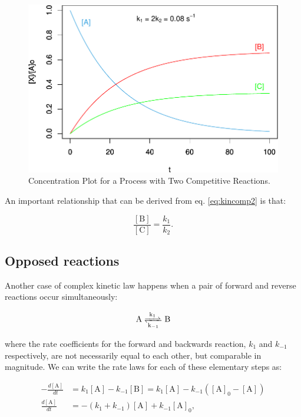 \documentclass[
  9pt,
]{extbook}
\theoremstyle{definition}
\theoremstyle{definition}
\theoremstyle{definition}
\theoremstyle{remark}
\begin{document}
\begin{figure}

{\centering \includegraphics{pchem1_files/figure-latex/figk7-1} 

}

\caption{Concentration Plot for a Process with Two Competitive Reactions.}\label{fig:figk7}
\end{figure}

An important relationship that can be derived from eq. \eqref{eq:kincomp2} is that:

\begin{equation}
\frac{[\mathrm{B}]}{[\mathrm{C}]} =\frac{k_1}{k_2}.
\label{eq:kincomp5b}
\end{equation}

\hypertarget{opposed-reactions}{%
\subsection{Opposed reactions}\label{opposed-reactions}}

Another case of complex kinetic law happens when a pair of forward and reverse reactions occur simultaneously:

\begin{equation}
\mathrm{A}\ce{<=>[k_1][k_{-1}]}\mathrm{B}
\end{equation}

where the rate coefficients for the forward and backwards reaction, \(k_1\) and \(k_{-1}\) respectively, are not necessarily equal to each other, but comparable in magnitude. We can write the rate laws for each of these elementary steps as:

\begin{equation}
\begin{aligned}
-\frac{d[\mathrm{A}]}{dt} &=k_1 [\mathrm{A}]-k_{-1} [\mathrm{B}] = k_1 [\mathrm{A}]-k_{-1}\left([\mathrm{A}]_0-[\mathrm{A}]\right) \\
\frac{d[\mathrm{A}]}{dt} &=-(k_1+k_{-1})[\mathrm{A}] + k_{-1}[\mathrm{A}]_0,
\end{aligned}
\label{eq:kinopp1}
\end{equation}
\end{document}
